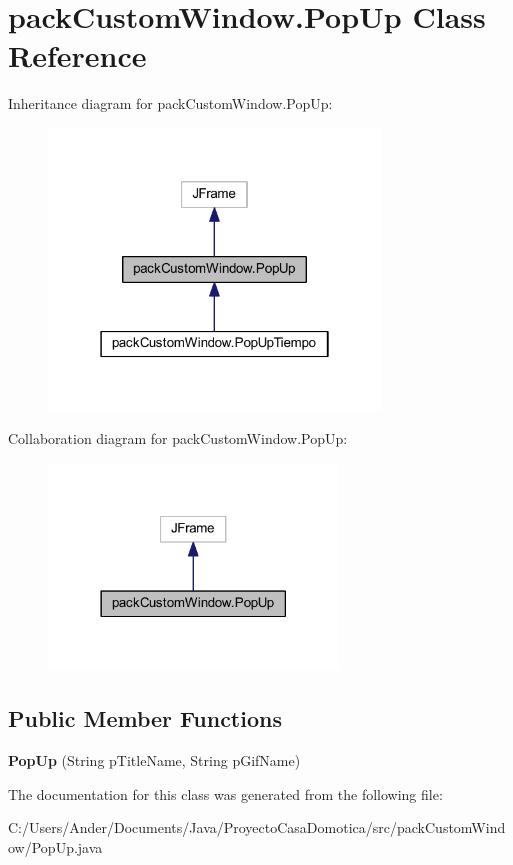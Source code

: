 \hypertarget{classpack_custom_window_1_1_pop_up}{}\section{pack\+Custom\+Window.\+Pop\+Up Class Reference}
\label{classpack_custom_window_1_1_pop_up}


Inheritance diagram for pack\+Custom\+Window.\+Pop\+Up\+:
\nopagebreak
\begin{figure}[H]
\begin{center}
\leavevmode
\includegraphics[width=250pt]{classpack_custom_window_1_1_pop_up__inherit__graph}
\end{center}
\end{figure}


Collaboration diagram for pack\+Custom\+Window.\+Pop\+Up\+:
\nopagebreak
\begin{figure}[H]
\begin{center}
\leavevmode
\includegraphics[width=218pt]{classpack_custom_window_1_1_pop_up__coll__graph}
\end{center}
\end{figure}
\subsection*{Public Member Functions}
\begin{DoxyCompactItemize}
\item 
\mbox{\label{classpack_custom_window_1_1_pop_up_ac1f51f735e63bc5f33dbe17e82cc3e89}} 
{\bfseries Pop\+Up} (String p\+Title\+Name, String p\+Gif\+Name)
\end{DoxyCompactItemize}


The documentation for this class was generated from the following file\+:\begin{DoxyCompactItemize}
\item 
C\+:/\+Users/\+Ander/\+Documents/\+Java/\+Proyecto\+Casa\+Domotica/src/pack\+Custom\+Window/Pop\+Up.\+java\end{DoxyCompactItemize}
